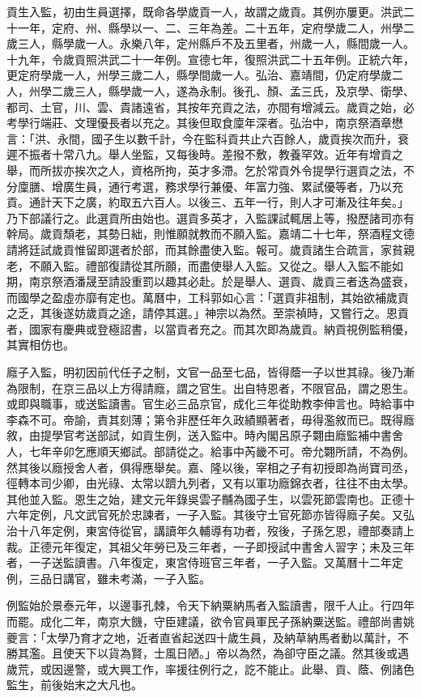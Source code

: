 貢生入監，初由生員選擇，既命各學歲貢一人，故謂之歲貢。其例亦屢更。洪武二十一年，定府、州、縣學以一、二、三年為差。二十五年，定府學歲二人，州學二歲三人，縣學歲一人。永樂八年，定州縣戶不及五里者，州歲一人，縣間歲一人。十九年，令歲貢照洪武二十一年例。宣德七年，復照洪武二十五年例。正統六年，更定府學歲一人，州學三歲二人，縣學間歲一人。弘治、嘉靖間，仍定府學歲二人，州學二歲三人，縣學歲一人，遂為永制。後孔、顏、孟三氏，及京學、衛學、都司、土官，川、雲、貴諸遠省，其按年充貢之法，亦間有增減云。歲貢之始，必考學行端莊、文理優長者以充之。其後但取食廩年深者。弘治中，南京祭酒章懋言：「洪、永間，國子生以數千計，今在監科貢共止六百餘人，歲貢挨次而升，衰遲不振者十常八九。舉人坐監，又每後時。差撥不敷，教養罕效。近年有增貢之舉，而所拔亦挨次之人，資格所拘，英才多滯。乞於常貢外令提學行選貢之法，不分廩膳、增廣生員，通行考選，務求學行兼優、年富力強、累試優等者，乃以充貢。通計天下之廣，約取五六百人。以後三、五年一行，則人才可漸及往年矣。」乃下部議行之。此選貢所由始也。選貢多英才，入監課試輒居上等，撥歷諸司亦有幹局。歲貢頹老，其勢日絀，則惟願就教而不願入監。嘉靖二十七年，祭酒程文德請將廷試歲貢惟留即選者於部，而其餘盡使入監。報可。歲貢諸生合疏言，家貧親老，不願入監。禮部復請從其所願，而盡使舉人入監。又從之。舉人入監不能如期，南京祭酒潘晟至請設重罰以趣其必赴。於是舉人、選貢、歲貢三者迭為盛衰，而國學之盈虛亦靡有定也。萬曆中，工科郭如心言：「選貢非祖制，其始欲補歲貢之乏，其後遂妨歲貢之途，請停其選。」神宗以為然。至崇禎時，又嘗行之。恩貢者，國家有慶典或登極詔書，以當貢者充之。而其次即為歲貢。納貢視例監稍優，其實相仿也。

廕子入監，明初因前代任子之制，文官一品至七品，皆得蔭一子以世其祿。後乃漸為限制，在京三品以上方得請廕，謂之官生。出自特恩者，不限官品，謂之恩生。或即與職事，或送監讀書。官生必三品京官，成化三年從助教李伸言也。時給事中李森不可。帝諭，責其刻薄；第令非歷任年久政績顯著者，毋得濫敘而已。既得廕敘，由提學官考送部試，如貢生例，送入監中。時內閣呂原子翾由廕監補中書舍人，七年辛卯乞應順天鄉試。部請從之。給事中芮畿不可。帝允翾所請，不為例。然其後以廕授舍人者，俱得應舉矣。嘉、隆以後，宰相之子有初授即為尚寶司丞，徑轉本司少卿，由光祿、太常以躋九列者，又有以軍功廕錦衣者，往往不由太學。其他並入監。恩生之始，建文元年錄吳雲子黼為國子生，以雲死節雲南也。正德十六年定例，凡文武官死於忠諫者，一子入監。其後守土官死節亦皆得廕子矣。又弘治十八年定例，東宮侍從官，講讀年久輔導有功者，歿後，子孫乞恩，禮部奏請上裁。正德元年復定，其祖父年勞已及三年者，一子即授試中書舍人習字；未及三年者，一子送監讀書。八年復定，東宮侍班官三年者，一子入監。又萬曆十二年定例，三品日講官，雖未考滿，一子入監。

例監始於景泰元年，以邊事孔棘，令天下納粟納馬者入監讀書，限千人止。行四年而罷。成化二年，南京大饑，守臣建議，欲令官員軍民子孫納粟送監。禮部尚書姚夔言：「太學乃育才之地，近者直省起送四十歲生員，及納草納馬者動以萬計，不勝其濫。且使天下以貨為賢，士風日陋。」帝以為然，為卻守臣之議。然其後或遇歲荒，或因邊警，或大興工作，率援往例行之，訖不能止。此舉、貢、蔭、例諸色監生，前後始末之大凡也。

